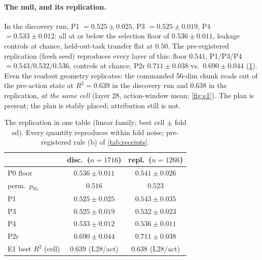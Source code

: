 \documentclass{article}
\begin{document}
\paragraph{The null, and its replication.}
In the discovery run, P1 $=0.525\pm0.025$, P3 $=0.525\pm0.019$, P4
$=0.533\pm0.012$: all at or below the selection floor of $0.536\pm0.011$,
leakage controls at chance, held-out-task transfer flat at $0.50$. The
pre-registered replication (fresh seed) reproduces every layer of this:
floor $0.541$, P1/P3/P4 $=0.543/0.532/0.536$, controls at chance, P2r
$0.711\pm0.038$ vs.\ $0.690\pm0.044$ (\cref{tab:replication}). Even the
readout geometry replicates: the commanded 56-dim chunk reads out of the
pre-action state at $R^2{=}0.639$ in the discovery run and $0.638$ in the
replication, \emph{at the same cell} (layer 28, action-window mean;
\cref{fig:e1}). The plan is present; the plan is stably placed; attribution
still is not.

\begin{table}[t]
\caption{The replication in one table (linear family; best cell $\pm$ fold
sd). Every quantity reproduces within fold noise; pre-registered rule (b) of
\cref{tab:receipts}.}
\label{tab:replication}
\vskip 0.1in
\centering
\small
\setlength{\tabcolsep}{3.5pt}
\begin{tabular}{lcc}
\toprule
 & disc.\ ($n{=}1716$) & repl.\ ($n{=}1266$) \\
\midrule
P0 floor & $0.536\pm0.011$ & $0.541\pm0.026$ \\
perm.\ $p_{95}$ & $0.516$ & $0.523$ \\
P1 & $0.525\pm0.025$ & $0.543\pm0.035$ \\
P3 & $0.525\pm0.019$ & $0.532\pm0.023$ \\
P4 & $0.533\pm0.012$ & $0.536\pm0.011$ \\
P2r & $0.690\pm0.044$ & $0.711\pm0.038$ \\
E1 best $R^2$ (cell) & $0.639$ (L28/act) & $0.638$ (L28/act) \\
\bottomrule
\end{tabular}
\vskip -0.1in
\end{table}
\end{document}
